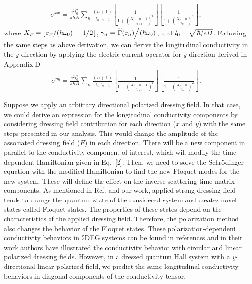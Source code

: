 \documentclass{article}
\begin{document}
\begin{itemize}
{\begin{equation}
    \begin{aligned}
      \sigma^{xx}  =
      \frac{e^2l_0^2}{\pi\hbar A}
      \sum_{n}
      \frac{(n+1)}{\gamma_{n}\gamma_{n+1}}
      \left[
        \frac{1}
        {
          1 + \left(\frac{X_F - n -1}{\gamma_{n+1}}\right)^2
        }
      \right]
      \left[
        \frac{1}
        {
          1 + \left(\frac{X_F - n}{\gamma_{n}}\right)^2
        }
      \right],
    \end{aligned}
  \end{equation}
  where $X_F = \left[\flatfrac{\varepsilon_F}{(\hbar \omega_0)} - \flatfrac{1}{2}\right]$,
  $\gamma_n = \flatfrac{\widetilde{{\Gamma}}(\varepsilon_n)}{(\hbar \omega_0)}$, and $l_0 = \sqrt{\flatfrac{\hbar}{eB}}$.
  Following the same steps as above derivation, we can derive the longitudinal conductivity in the $y$-direction by applying the electric current operator for $y$-direction derived in Appendix D
  \begin{equation} \tag{36}
    \begin{aligned}
      {\sigma}^{yy} =
      \frac{e^2l_0^2}{\pi\hbar A}
      \sum_{n}
      \frac{(n+1)}{\gamma_{n}\gamma_{n+1}}
      \left[
        \frac{1}
        {
          1 + \left(\frac{X_F - n -1}{\gamma_{n+1}}\right)^2
        }
      \right]
      \left[
        \frac{1}
        {
          1 + \left(\frac{X_F - n}{\gamma_{n}}\right)^2
        }
      \right].
    \end{aligned}
  \end{equation}
  }
\end{itemize}

Suppose we apply an arbitrary directional polarized dressing field. In that case, we could derive an expression for the longitudinal conductivity components by considering dressing field contribution for each direction ($x$ and $y$) with the same steps presented in our analysis. This would change the amplitude of the associated dressing field ($E$) in each direction. There will be a new component in parallel to the conductivity component of interest, which will modify the time-dependent Hamiltonian given in Eq.~[2]. Then, we need to solve the Schrödinger equation with the modified Hamiltonian to find the new Floquet modes for the new system. These will define the effect on the inverse scattering time matrix components. As mentioned in Ref. \cite{wackerl20} and our work, applied strong dressing field tends to change the quantum state of the considered system and creates novel states called Floquet states. The properties of these states depend on the characteristics of the applied dressing field. Therefore, the polarization method also changes the behavior of the Floquet states. These polarization-dependent conductivity behaviors in 2DEG systems can be found in references \cite{wackerl20,morina15} and in their work authors have illustrated the conductivity behavior with circular and linear polarized dressing fields. However, in a dressed quantum Hall system with a $y$-directional linear polarized field, we predict the same longitudinal conductivity behaviors in diagonal components of the conductivity tensor.
\end{document}
